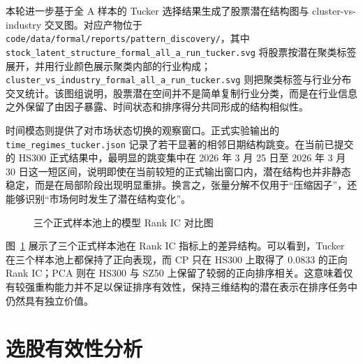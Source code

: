 本轮进一步基于全 A 样本的 Tucker 选择结果生成了股票潜在结构图与 cluster-vs-industry 交叉图。对应产物位于 \texttt{code/data/formal/reports/pattern\_discovery/}，其中 \texttt{stock\_latent\_structure\_formal\_all\_a\_run\_tucker.svg} 将股票按潜在聚类标签展开，并用行业颜色展示聚类内部的行业构成；\texttt{cluster\_vs\_industry\_formal\_all\_a\_run\_tucker.svg} 则把聚类标签与行业分布交叉统计。该图组说明，股票潜在空间并不是简单复制行业分类，而是在行业信息之外保留了由因子暴露、时间状态和排序得分共同形成的结构相似性。

时间模态则提供了对市场状态切换的观察窗口。正式实验输出的 \texttt{time\_regimes\_tucker.json} 记录了若干显著的相邻日期结构跳变。在当前已提交的 HS300 正式结果中，最明显的跳变集中在 2026 年 3 月 25 日至 2026 年 3 月 30 日这一短区间，说明即使在当前较短的正式输出窗口内，潜在结构也并非静态稳定，而是在局部阶段出现明显重排。换言之，张量分解不仅用于“压缩因子”，还能够识别“市场何时发生了潜在结构变化”。

\begin{figure}[!t]
\centering
{}
\caption{三个正式样本池上的模型 Rank IC 对比图}
\label{fig:rankic}
\end{figure}

图~\ref{fig:rankic} 展示了三个正式样本池在 Rank IC 指标上的差异结构。可以看到，Tucker 在三个样本池上都保持了正向表现，而 CP 只在 HS300 上取得了 0.0833 的正向 Rank IC；PCA 则在 HS300 与 SZ50 上保留了较弱的正向排序相关。这意味着仅有较强重构能力并不足以保证排序有效性，保持三维结构的潜在表示在排序任务中仍然具有独立价值。

\section{选股有效性分析}

